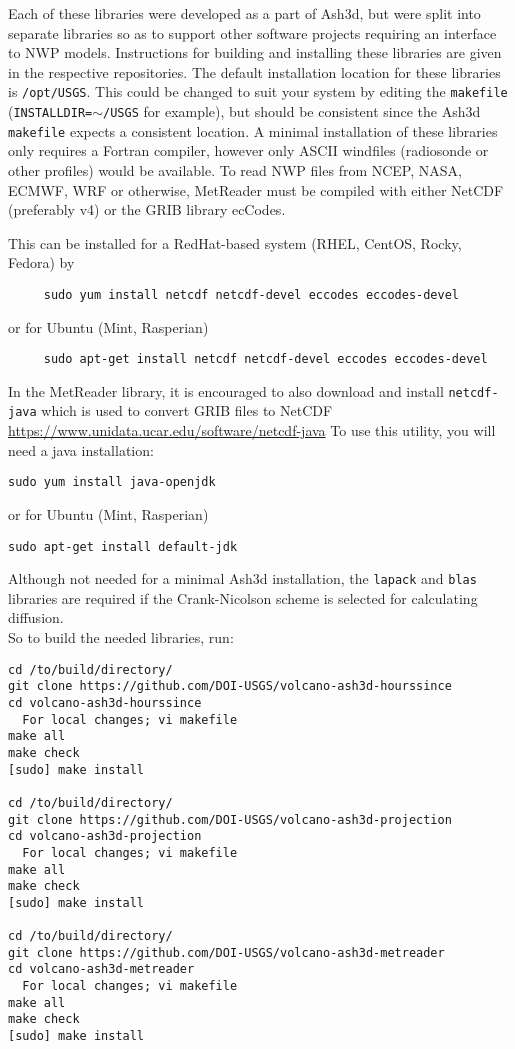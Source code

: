 Each of these libraries were developed as a part of Ash3d, but were split into
separate libraries so as to support other software projects requiring an
interface to NWP models.  Instructions for building and installing these
libraries are given in the respective repositories.  The default installation
location for these libraries is \texttt{/opt/USGS}.  This could be changed to suit
your system by editing the \texttt{makefile}
(\texttt{INSTALLDIR=}$\sim$\texttt{/USGS} for example),
but should be consistent since the Ash3d \texttt{makefile} expects
a consistent location.  A minimal installation of these libraries only requires
a Fortran compiler, however only ASCII windfiles (radiosonde or other profiles)
would be available.  To read NWP files from NCEP, NASA, ECMWF, WRF or otherwise, 
MetReader must be compiled with either NetCDF (preferably v4) or the GRIB
library ecCodes.

This can be installed for a RedHat-based system (RHEL, CentOS, Rocky, Fedora) by
\begin{verbatim}
     sudo yum install netcdf netcdf-devel eccodes eccodes-devel
\end{verbatim}
or for Ubuntu (Mint, Rasperian)
\begin{verbatim}
     sudo apt-get install netcdf netcdf-devel eccodes eccodes-devel
\end{verbatim}

In the MetReader library, it is encouraged to also download and install 
\texttt{netcdf-java} which is used to convert GRIB files to NetCDF
\url{https://www.unidata.ucar.edu/software/netcdf-java}
To use this utility, you will need a java installation:
\begin{verbatim}
sudo yum install java-openjdk
\end{verbatim}
or for Ubuntu (Mint, Rasperian)
\begin{verbatim}
sudo apt-get install default-jdk
\end{verbatim}

Although not needed for a minimal Ash3d installation, the \texttt{lapack} and \texttt{blas}
libraries are required if the Crank-Nicolson scheme is selected for calculating
diffusion.\\

So to build the needed libraries, run:
\begin{verbatim}
cd /to/build/directory/
git clone https://github.com/DOI-USGS/volcano-ash3d-hourssince
cd volcano-ash3d-hourssince
  For local changes; vi makefile
make all
make check
[sudo] make install

cd /to/build/directory/
git clone https://github.com/DOI-USGS/volcano-ash3d-projection
cd volcano-ash3d-projection
  For local changes; vi makefile
make all
make check
[sudo] make install

cd /to/build/directory/
git clone https://github.com/DOI-USGS/volcano-ash3d-metreader
cd volcano-ash3d-metreader
  For local changes; vi makefile
make all
make check
[sudo] make install
\end{verbatim}

